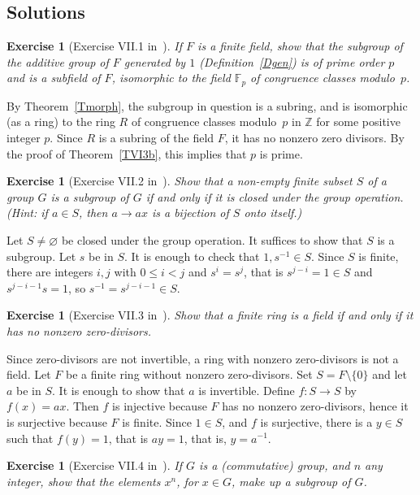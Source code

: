 \documentclass[12pt,letterpaper]{article}
\newcommand{\F}{\mathbb{F}}
\newcommand{\Z}{\mathbb{Z}}
\newtheorem{exer}[thm]{Exercise}
\theoremstyle{definition}
\begin{document}
\subsection{Solutions} %

\begin{exer}[Exercise VII.1 in~\cite{weil1979}]
If $F$ is a finite field, show that the subgroup of the additive group of $F$ generated by $1$ (Definition~\ref{Dgen}) is of prime order $p$ and is a subfield of $F$, isomorphic to the field $\F_p$ of congruence classes modulo~$p$.
\end{exer}

By Theorem~\ref{Tmorph}, the subgroup in question is a subring, and is isomorphic (as a ring) to the ring $R$ of congruence classes modulo~$p$ in $\Z$ for some positive integer $p$. Since $R$ is a subring of the field $F$, it has no nonzero zero divisors. By the proof of Theorem~\ref{TVI3b}, this implies that $p$ is prime. 

\begin{exer}[Exercise VII.2 in~\cite{weil1979}]
Show that a non-empty finite subset $S$ of a group $G$ is a subgroup of $G$ if and only if it is closed under the group operation. (Hint: if $a\in S$, then $a\to ax$ is a bijection of $S$ onto itself.) 
\end{exer}

Let $S\ne\varnothing$ be closed under the group operation. It suffices to show that $S$ is a subgroup. Let $s$ be in $S$. It is enough to check that $1, s^{-1}\in S$. Since $S$ is finite, there are integers $i,j$ with $0\le i<j$ and $s^i=s^j$, that is $s^{j-i}=1\in S$ and $s^{j-i-1}s=1$, so $s^{-1}=s^{j-i-1}\in S$. 

\begin{exer}[Exercise VII.3 in~\cite{weil1979}]\label{ExVII3}
Show that a finite ring is a field if and only if it has no nonzero zero-divisors.
\end{exer}

Since zero-divisors are not invertible, a ring with nonzero zero-divisors is not a field. Let $F$ be a finite ring without nonzero zero-divisors. Set $S=F\setminus\{0\}$ and let $a$ be in $S$. It is enough to show that $a$ is invertible. Define $f:S\to S$ by $f(x)=ax$. Then $f$ is injective because $F$ has no nonzero zero-divisors, hence it is surjective because $F$ is finite. Since $1\in S$, and $f$ is surjective, there is a $y\in S$ such that $f(y)=1$, that is $ay=1$, that is, $y=a^{-1}$. 

\begin{exer}[Exercise VII.4 in~\cite{weil1979}]
If $G$ is a (commutative) group, and $n$ any integer, show that the elements $x^n$, for $x\in G$, make up a subgroup of $G$.
\end{exer}
\end{document}
